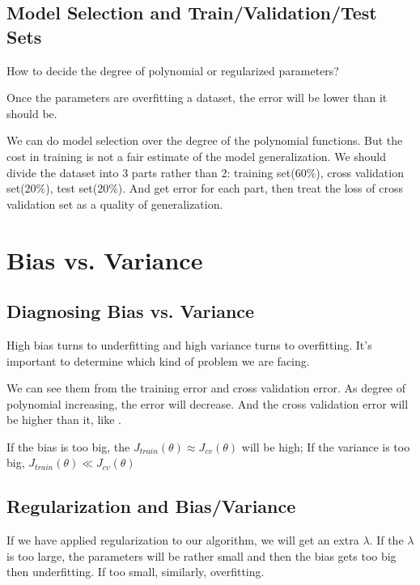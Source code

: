 \documentclass[en,11pt,english,black,simple]{../elegantbook}
\begin{document}
\subsection{Model Selection and Train/Validation/Test Sets}

How to decide the degree of polynomial or regularized parameters? 

Once the parameters are  overfitting a dataset, the error will be lower than it should be. 

We can do model selection over the degree of the polynomial functions. But the cost in training is not a fair estimate of the model generalization. We should divide the dataset into 3 parts rather than 2: training set(60\%), cross validation set(20\%), test set(20\%). And get error for each part, then treat the loss of cross validation set as a quality of generalization.

\section{Bias vs. Variance}


\subsection{Diagnosing Bias vs. Variance}

High bias turns to underfitting and high variance turns to overfitting. It's important to determine which kind of problem we are facing. 

We can see them from the training error and cross validation error. As degree of polynomial increasing, the error will decrease. And the cross validation error will be higher than it, like .


If the bias is too big, the \(J_{train}(\theta) \approx J_{cv}(\theta)\) will be high; If the variance is too big, \(J_{train}(\theta) \ll  J_{cv}(\theta)\) 

\subsection{Regularization and Bias/Variance}

If we have applied regularization to our algorithm, we will get an extra \(\lambda\). If the \(\lambda\) is too large, the parameters will be rather small and then the bias gets too big then underfitting. If too small, similarly, overfitting.
\end{document}
